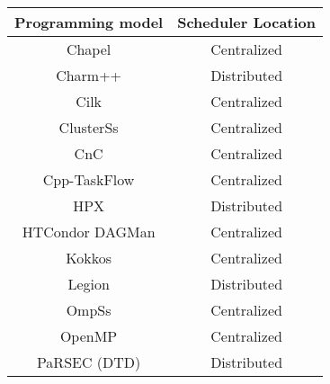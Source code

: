 \begin{tabular}{cc}
\hline
Programming model & Scheduler Location \\
\hline
Chapel & Centralized\\
Charm++ & Distributed\\
Cilk & Centralized\\
ClusterSs & Centralized\\
CnC & Centralized\\
Cpp-TaskFlow & Centralized\\
HPX & Distributed\\
HTCondor DAGMan & Centralized\\
Kokkos & Centralized\\
Legion & Distributed\\
OmpSs & Centralized\\
OpenMP & Centralized\\
PaRSEC (DTD) & Distributed\\
\hline
\end{tabular}
